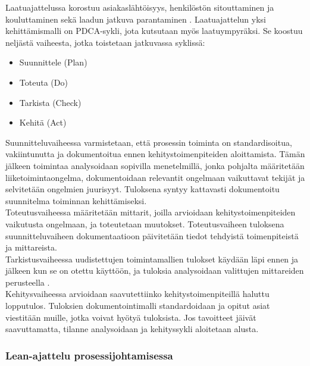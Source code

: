 \documentclass[finnish,12pt,a4paper,pdftex]{article}
\begin{document}
Laatuajattelussa korostuu asiakaslähtöisyys, henkilöstön sitouttaminen ja kouluttaminen sekä laadun jatkuva parantaminen \citep{teollisuustalous}. Laatuajattelun yksi kehittämismalli on PDCA-sykli, jota kutsutaan myös laatuympyräksi. Se koostuu neljästä vaiheesta, jotka toistetaan jatkuvassa syklissä: \\

\begin{itemize}
\setlength{\itemsep}{0pt}
    \item Suunnittele (Plan)
    \item Toteuta (Do)
    \item Tarkista (Check)
    \item Kehitä (Act)
\end{itemize}

Suunnitteluvaiheessa varmistetaan, että prosessin toiminta on standardisoitua, vakiintunutta ja dokumentoitua ennen kehitystoimenpiteiden aloittamista. Tämän jälkeen toimintaa analysoidaan sopivilla menetelmillä, jonka pohjalta määritetään liiketoimintaongelma, dokumentoidaan relevantit ongelmaan vaikuttavat tekijät ja selvitetään ongelmien juurisyyt. Tuloksena syntyy kattavasti dokumentoitu suunnitelma toiminnan kehittämiseksi. \citep{teollisuustalous, mohapatra} \\

Toteutusvaiheessa määritetään mittarit, joilla arvioidaan kehitystoimenpiteiden vaikutusta ongelmaan, ja toteutetaan muutokset. Toteutusvaiheen tuloksena suunnitteluvaiheen dokumentaatioon päivitetään tiedot tehdyistä toimenpiteistä ja mittareista. \citep{teollisuustalous, mohapatra}\\

Tarkistusvaiheessa uudistettujen toimintamallien tulokset käydään läpi ennen ja jälkeen kun se on otettu käyttöön, ja tuloksia analysoidaan valittujen mittareiden perusteella \citep{teollisuustalous}. \\

Kehitysvaiheessa arvioidaan saavutettiinko kehitystoimenpiteillä haluttu lopputulos. Tuloksien dokumentointimalli standardoidaan ja opitut asiat viestitään muille, jotka voivat hyötyä tuloksista. Jos tavoitteet jäivät saavuttamatta, tilanne analysoidaan ja kehityssykli aloitetaan alusta.\citep{teollisuustalous}

\subsubsection{Lean-ajattelu prosessijohtamisessa}
\end{document}
